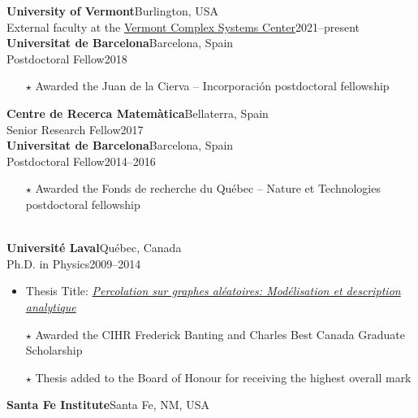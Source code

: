 \documentclass[11pt]{article}
\newcommand{\TitreSection}[1]{\colorbox{background}{\makebox[\textwidth-0.5em][c]{\Large\textrm{\textsc{#1}}}}\vspace{0.75\baselineskip}\\}
\begin{document}
%
\textbf{University of Vermont}\hfill Burlington, USA\\
External faculty at the \href{https://vermontcomplexsystems.org}{Vermont Complex Systems Center}\hfill 2021--present\vspace{0.75\baselineskip}\\
%
\textbf{Universitat de Barcelona}\hfill Barcelona, Spain\\
Postdoctoral Fellow\hfill 2018
\begin{itemize}[leftmargin=1.5em]\small
  \item[$\star$] Awarded the Juan de la Cierva -- Incorporaci\'on postdoctoral fellowship
\end{itemize}
%
\textbf{Centre de Recerca Matem\`atica}\hfill Bellaterra, Spain\\
Senior Research Fellow\hfill 2017\vspace{0.75\baselineskip}\\
%
\textbf{Universitat de Barcelona}\hfill Barcelona, Spain\\
Postdoctoral Fellow\hfill 2014--2016
\begin{itemize}[leftmargin=1.5em]\small
  \item[$\star$] Awarded the Fonds de recherche du Qu\'ebec -- Nature et Technologies postdoctoral fellowship
\end{itemize} \vspace{0.75\baselineskip}
%
%
%
%
%
\TitreSection{Education}
%
\textbf{Universit\'e Laval}\hfill Qu\'ebec, Canada\\
Ph.D. in Physics\hfill 2009--2014
\begin{itemize}[leftmargin=1.5em]\small
  \item Thesis Title: \href{http://hdl.handle.net/20.500.11794/25058}{\textit{Percolation sur graphes al\'eatoires: Mod\'elisation et description analytique}}\footnotemark
  \item[$\star$] Awarded the CIHR Frederick Banting and Charles Best Canada Graduate Scholarship
  \item[$\star$] Thesis added to the Board of Honour for receiving the highest overall mark
\end{itemize}
%
\textbf{Santa Fe Institute}\hfill Santa Fe, NM, USA\\
\end{document}
